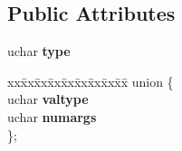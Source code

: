 \subsection*{Public Attributes}
\begin{DoxyCompactItemize}
\item 
\mbox{\label{structident_a89f53b6ecbddf478efd372ffe0ae6eda}} 
uchar {\bfseries type}
\item 
\mbox{\label{structident_af3d1413531f5a88b55ff6826eea9cbc0}} 
\begin{tabbing}
xx\=xx\=xx\=xx\=xx\=xx\=xx\=xx\=xx\=\kill
union \{\\
\>uchar {\bfseries valtype}\\
\>uchar {\bfseries numargs}\\
\}; \\


\end{tabbing}
\end{DoxyCompactItemize}

